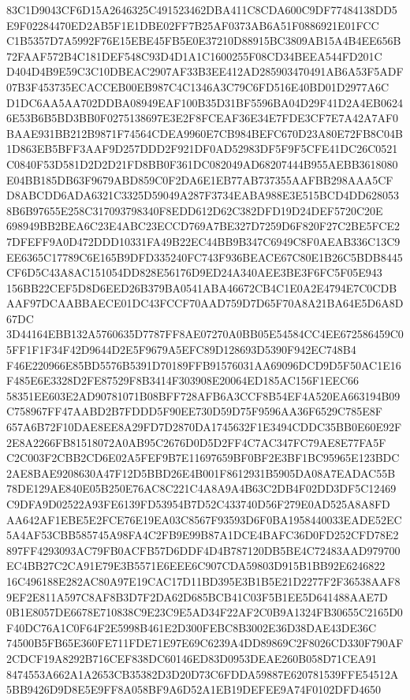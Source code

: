 \documentclass[UTF8,fontset=fandol,zihao=-4,a4paper]{ctexart}
\begin{document}
{{83C1D9043CF6D15A2646325C491523462DBA411C8CDA600C9DF77484138DD5E9F02284470ED2AB5F1E1DBE02FF7B25AF0373AB6A51F0886921E01FCC
C1B5357D7A5992F76E15EBE45FB5E0E37210D88915BC3809AB15A4B4EE656B72FAAF572B4C181DEF548C93D4D1A1C1600255F08CD34BEEA544FD201C
D404D4B9E59C3C10DBEAC2907AF33B3EE412AD285903470491AB6A53F5ADF07B3F453735ECACCEB00EB987C4C1346A3C79C6FD516E40BD01D2977A6C
D1DC6AA5AA702DDBA08949EAF100B35D31BF5596BA04D29F41D2A4EB06246E53B6B5BD3BB0F0275138697E3E2F8FCEAF36E34E7FDE3CF7E7A42A7AF0
BAAE931BB212B9871F74564CDEA9960E7CB984BEFC670D23A80E72FB8C04B1D863EB5BFF3AAF9D257DDD2F921DF0AD52983DF5F9F5CFE41DC26C0521
C0840F53D581D2D2D21FD8BB0F361DC082049AD68207444B955AEBB3618080E04BB185DB63F9679ABD859C0F2DA6E1EB77AB737355AAFBB298AAA5CF
D8ABCDD6ADA6321C3325D59049A287F3734EABA988E3E515BCD4DD6280538B6B97655E258C317093798340F8EDD612D62C382DFD19D24DEF5720C20E
698949BB2BEA6C23E4ABC23ECCD769A7BE327D7259D6F820F27C2BE5FCE27DFEFF9A0D472DDD10331FA49B22EC44BB9B347C6949C8F0AEAB336C13C9
EE6365C17789C6E165B9DFD335240FC743F936BEACE67C80E1B26C5BDB8445CF6D5C43A8AC151054DD828E56176D9ED24A340AEE3BE3F6FC5F05E943
156BB22CEF5D8D6EED26B379BA0541ABA46672CB4C1E0A2E4794E7C0CDBAAF97DCAABBAECE01DC43FCCF70AAD759D7D65F70A8A21BA64E5D6A8D67DC
3D44164EBB132A5760635D7787FF8AE07270A0BB05E54584CC4EE672586459C05FF1F1F34F42D9644D2E5F9679A5EFC89D128693D5390F942EC748B4
F46E220966E85BD5576B5391D70189FFB91576031AA69096DCD9D5F50AC1E16F485E6E3328D2FE87529F8B3414F303908E20064ED185AC156F1EEC66
58351EE603E2AD90781071B08BFF728AFB6A3CCF8B54EF4A520EA663194B09C758967FF47AABD2B7FDDD5F90EE730D59D75F9596AA36F6529C785E8F
657A6B72F10DAE8EE8A29FD7D2870DA1745632F1E3494CDDC35BB0E60E92F2E8A2266FB81518072A0AB95C2676D0D5D2FF4C7AC347FC79AE8E77FA5F
C2C003F2CBB2CD6E02A5FEF9B7E11697659BF0BF2E3BF1BC95965E123BDC2AE8BAE9208630A47F12D5BBD26E4B001F8612931B5905DA08A7EADAC55B
78DE129AE840E05B250E76AC8C221C4A8A9A4B63C2DB4F02DD3DF5C12469C9DFA9D02522A93FE6139FD53954B7D52C433740D56F279E0AD525A8A8FD
AA642AF1EBE5E2FCE76E19EA03C8567F93593D6F0BA1958440033EADE52EC5A4AF53CBB585745A98FA4C2FB9E99B87A1DCE4BAFC36D0FD252CFD78E2
897FF4293093AC79FB0ACFB57D6DDF4D4B787120DB5BE4C72483AAD979700EC4BB27C2CA91E79E3B5571E6EEE6C907CDA59803D915B1BB92E6246822
16C496188E282AC80A97E19CAC17D11BD395E3B1B5E21D2277F2F36538AAF89EF2E811A597C8AF8B3D7F2DA62D685BCB41C03F5B1EE5D641488AAE7D
0B1E8057DE6678E710838C9E23C9E5AD34F22AF2C0B9A1324FB30655C2165D0F40DC76A1C0F64F2E5998B461E2D300FEBC8B3002E36D38DAE43DE36C
74500B5FB65E360FE711FDE71E97E69C6239A4DD89869C2F8026CD330F790AF2CDCF19A8292B716CEF838DC60146ED83D0953DEAE260B058D71CEA91
8474553A662A1A2653CB35382D3D20D73C6FDDA59887E620781539FFE54512A5BB9426D9D8E5E9FF8A058BF9A6D52A1EB19DEFEE9A74F0102DFD4650
}}
\end{document}
